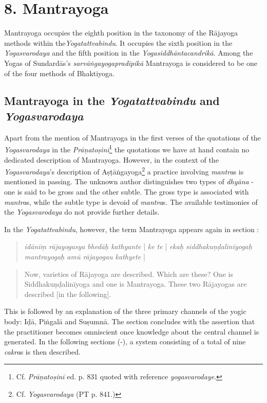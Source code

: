 \section{8. Mantrayoga}
\label{dhyānayogaintro}

Mantrayoga occupies the eighth position in the taxonomy of the Rājayoga methods within the\textit{Yogatattvabindu}. It occupies the sixth position in the \textit{Yogasvarodaya} and the fifth position in the \textit{Yogasiddhāntacandrikā}. Among the Yogas of Sundardās's \textit{sarvāṅgayogapradīpikā} Mantrayoga is considered to be one of the four methods of Bhaktiyoga.

\subsection{Mantrayoga in the \textit{Yogatattvabindu} and \textit{Yogasvarodaya}}
\label{bindumantra}
Apart from the mention of Mantrayoga in the first verses of the quotations of the \textit{Yogasvarodaya} in the \textit{Prāṇatoṣinī}\footnote{Cf. \emph{Prāṇatoṣinī} ed. p. 831 quoted with reference \textit{yogasvarodaye}.} the quotations we have at hand contain no dedicated description of Mantrayoga. However, in the context of the \emph{Yogasvarodaya}'s description of Aṣṭāṅgayoga\footnote{Cf. \emph{Yogasvarodaya} (PT p. 841.)} a practice involving \textit{mantra}s is mentioned in passing. The unknown author distinguishes two types of \textit{dhyāna} - one is said to be gross and the other subtle. The gross type is associated with \textit{mantra}s, while the subtle type is devoid of  \textit{mantra}s. The available testimonies of the \emph{Yogasvarodaya} do not provide further details.  

In the \textit{Yogatattvabindu}, however, the term Mantrayoga appears again in section :

\begin{quote}
  \textit{idānīṃ rājayogasya bhedāḥ kathyante} | \textit{ke te} | \textit{ekaḥ siddhakuṇḍalinīyogaḥ mantrayogaḥ amū rājayogau kathyete} |
\end{quote}
\begin{quote}
  Now, varieties of Rājayoga are described. Which are these? One is Siddhakuṇḍalinīyoga and one is Mantrayoga. These two Rājayogas are described [in the following].
\end{quote}

This is followed by an explanation of the three primary channels of the yogic body: Iḍā, Piṅgalā and Suṣumnā. The section concludes with the assertion that the practitioner becomes omniscient once knowledge about the central channel is generated. In the following sections (-), a system consisting of a total of nine \textit{cakra}s is then described.

